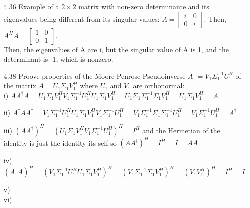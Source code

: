 \documentclass[letterpaper,12pt]{article}
\theoremstyle{definition}
\begin{document}
\begin{enumerate}
\item[4.36]
Example of a $2 \times 2$ matrix with non-zero determinante and its eigenvalues being different from its singular values: $A = \begin{bmatrix}
i & 0 \\ 0 & i
\end{bmatrix}$. Then, $A^{H}A =\begin{bmatrix}
1 & 0 \\ 0 & 1
\end{bmatrix}$.  \\ Then, the eigenvalues of A are i, but the singular value of A is 1, and the determinant is -1, which is nonzero. \\
\item[4.38] Proove properties of the Moore-Penrose Pseudoinverse $A^{\dagger}=V_1\Sigma_1^{-1}U_1^H$ of the matrix $A = U_1 \Sigma_1 V_1^H$ where $U_1$ and $V_1$ are orthonormal:\\
i) $AA^{\dagger}A = U_1 \Sigma_1 V_1^H V_1\Sigma_1^{-1}U_1^HU_1 \Sigma_1 V_1^H  = U_1 \Sigma_1 \Sigma_1^{-1} \Sigma_1 V_1^H = U_1 \Sigma_1  V_1^H  =A$

ii) $A^{\dagger}AA^{\dagger} = V_1\Sigma_1^{-1}U_1^HU_1 \Sigma_1 V_1^HV_1\Sigma_1^{-1}U_1^H =V_1\Sigma_1^{-1} \Sigma_1 \Sigma_1^{-1}U_1^H  = V_1 \Sigma_1^{-1}U_1^H  = A^{\dagger}$

iii) $(AA^{\dagger})^H = (U_1 \Sigma_1 V_1^HV_1\Sigma_1^{-1}U_1^H)^H = I^H$ and the Hermetian of the identity is just the identity its self so $(AA^{\dagger})^H = I^H = I = AA^{\dagger}$

iv) $(A^{\dagger}A)^H = (V_1\Sigma_1^{-1}U_1^HU_1 \Sigma_1 V_1^H)^H = (V_1\Sigma_1^{-1}\Sigma_1 V_1^H)^H = (V_1 V_1^H)^H = I^H = I$ 

v)\\

vi)\\

\end{enumerate}
\end{document}
